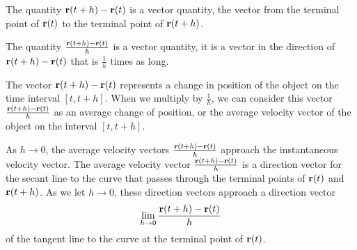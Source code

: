 \begin{activitySolution}
   \ba
    \item The quantity $\mathbf{r}(t+h)-\mathbf{r}(t)$ is a vector quantity, the vector from the terminal point of $\mathbf{r}(t)$ to the terminal point of $\mathbf{r}(t+h)$.

    \item The quantity $\frac{\mathbf{r}(t+h)-\mathbf{r}(t)}{h}$ is a vector quantity, it is a vector in the direction of $\mathbf{r}(t+h)-\mathbf{r}(t)$ that is $\frac{1}{h}$ times as long. 

    \item The vector $\mathbf{r}(t+h)-\mathbf{r}(t)$ represents a change in position of the object on the time interval $[t, t+h]$. When we multiply by $\frac{1}{h}$, we can consider this vector  $\frac{\mathbf{r}(t+h)-\mathbf{r}(t)}{h}$ as an average change of position, or the average velocity vector of the object on the interval $[t,t+h]$. 

    \item As $h \to 0$, the average velocity vectors $\frac{\mathbf{r}(t+h)-\mathbf{r}(t)}{h}$ approach the instantaneous velocity vector. The average velocity vector $\frac{\mathbf{r}(t+h)-\mathbf{r}(t)}{h}$ is a direction vector for the secant line to the curve that passes through the terminal points of $\mathbf{r}(t)$ and $\mathbf{r}(t+h)$. As we let $h \to 0$, these direction vectors approach a direction vector  
       \[\displaystyle \lim_{h \to 0} \frac{\mathbf{r}(t+h)-\mathbf{r}(t)}{h}\]
of the tangent line to the curve at the terminal point of $\mathbf{r}(t)$. 
    \ea

\end{activitySolution}
\aftera
